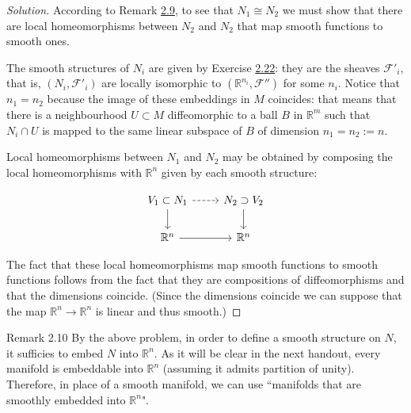 \begin{proof}[Solution]\leavevmode
According to Remark \hyperref[rk:2.9]{2.9}, to see that \(N_1\cong N_2\) we must show that there are local homeomorphisms between \(N_2\) and \(N_2\) that map smooth functions to smooth ones.

The smooth structures of \(N_i\) are given by Exercise \hyperref[exer:2.22]{2.22}: they are the sheaves \(\mathcal{F}'_i\), that is, \((N_i,\mathcal{F}'_i)\) are locally isomorphic to \((\mathbb{R}^{n_i},\mathcal{F}'')\) for some \(n_i\). Notice that \(n_1=n_2\) because the image of these embeddings in \(M\) coincides: that means that there is a neighbourhood \(U \subset M\) diffeomorphic to a ball \(B\) in \(\mathbb{R}^m\) such that \(N_i \cap U\) is mapped to the same linear subspace of \(B\) of dimension \(n_1=n_2:=n\).

Local homeomorphisms between \(N_1\) and \(N_2\) may be obtained by composing the local homeomorphisms with \(\mathbb{R}^{n}\) given by each smooth structure:

\[\begin{tikzcd}
	V_1 \subset N_1\arrow[r,dashed]\arrow[d]&N_2\supset V_2\arrow[d]\\
	\mathbb{R}^n\arrow[r]&\mathbb{R}^n
\end{tikzcd}\]


The fact that these local homeomorphisms map smooth functions to smooth functions follows from the fact that they are compositions of diffeomorphisms and that the dimensions coincide. (Since the dimensions coincide we can suppose that the map \(\mathbb{R}^{n}\to \mathbb{R}^{n}\) is linear and thus smooth.)
\end{proof}
\begin{thing5}{Remark 2.10}\leavevmode
By the above problem, in order to define a smooth structure on $N$, it sufficies to embed $N$ into \(\mathbb{R}^n\). As it will be clear in the next handout, every manifold is embeddable into \(\mathbb{R}^n\) (assuming it admits partition of unity). Therefore, in place of a smooth manifold, we can use ``manifolds that are smoothly embedded into \(\mathbb{R}^n\)".
\end{thing5}


